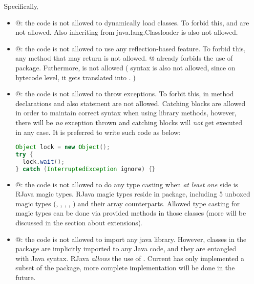 \documentclass[12pt]{article}
\begin{document}
\noindent
Specifically, 
\begin{itemize}

\item
@: 
the code is not allowed to dynamically load classes. To forbid this, 
 and 
are not allowed. Also inheriting from {java.lang.Classloader} is also not allowed. 

\item
@: 
the code is not allowed to use any reflection-based feature. To forbid this,
any method that may return  is not allowed. 
@ already forbids the use of 
 package. Futhermore, 
is not allowed ( syntax is also not allowed, since 
on bytecode level, it gets translated into . )

\item
@:
the code is not allowed to throw exceptions. To forbit this, 
 in method declarations and also
 statement are not allowed. Catching blocks
are allowed in order to maintain correct syntax when using
library methods, however, there will be \emph{no} exception thrown and 
catching blocks will \emph{not}
get executed in any case. It is preferred to write such code
as below:
\begin{lstlisting}[language=java]
Object lock = new Object();
try {
  lock.wait();
} catch (InterruptedException ignore) {}
\end{lstlisting}

\item
@:
the code is not allowed to do any type casting when 
\emph{at least one} side is RJava magic types. 
RJava magic types reside in 
package, including 5 unboxed magic types (, 
, , 
, ) and their array counterparts. 
Allowed type casting for magic types can be done via
provided methods in those classes 
(more will be discussed in the section about extensions). 

\item
@:
the code is not allowed to import any java library. However,
classes in the  package are implicitly 
imported to any Java code, and they are entangled
with Java syntax. RJava \emph{allows} the use of 
. Current \rjcfull has only implemented
a subset of the  package, 
more complete implementation will be done in the future. 


\end{itemize}
\end{document}
